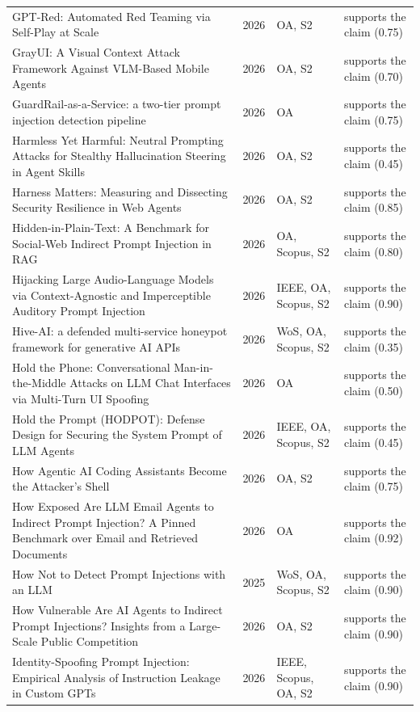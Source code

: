 \begin{longtable}{@{}%
  >{\raggedright\arraybackslash}p{}c%
  >{\raggedright\arraybackslash}p{}%
  >{\raggedright\arraybackslash}p{}@{}}
GPT-Red: Automated Red Teaming via Self-Play at Scale & 2026 & OA, S2 & supports the claim (0.75) \\
GrayUI: A Visual Context Attack Framework Against VLM-Based Mobile Agents & 2026 & OA, S2 & supports the claim (0.70) \\
GuardRail-as-a-Service: a two-tier prompt injection detection pipeline & 2026 & OA & supports the claim (0.75) \\
Harmless Yet Harmful: Neutral Prompting Attacks for Stealthy Hallucination Steering in Agent Skills & 2026 & OA, S2 & supports the claim (0.45) \\
Harness Matters: Measuring and Dissecting Security Resilience in Web Agents & 2026 & OA, S2 & supports the claim (0.85) \\
Hidden-in-Plain-Text: A Benchmark for Social-Web Indirect Prompt Injection in RAG & 2026 & OA, Scopus, S2 & supports the claim (0.80) \\
Hijacking Large Audio-Language Models via Context-Agnostic and Imperceptible Auditory Prompt Injection & 2026 & IEEE, OA, Scopus, S2 & supports the claim (0.90) \\
Hive-AI: a defended multi-service honeypot framework for generative AI APIs & 2026 & WoS, OA, Scopus, S2 & supports the claim (0.35) \\
Hold the Phone: Conversational Man-in-the-Middle Attacks on LLM Chat Interfaces via Multi-Turn UI Spoofing & 2026 & OA & supports the claim (0.50) \\
Hold the Prompt (HODPOT): Defense Design for Securing the System Prompt of LLM Agents & 2026 & IEEE, OA, Scopus, S2 & supports the claim (0.45) \\
How Agentic AI Coding Assistants Become the Attacker's Shell & 2026 & OA, S2 & supports the claim (0.75) \\
How Exposed Are LLM Email Agents to Indirect Prompt Injection? A Pinned Benchmark over Email and Retrieved Documents & 2026 & OA & supports the claim (0.92) \\
How Not to Detect Prompt Injections with an LLM & 2025 & WoS, OA, Scopus, S2 & supports the claim (0.90) \\
How Vulnerable Are AI Agents to Indirect Prompt Injections? Insights from a Large-Scale Public Competition & 2026 & OA, S2 & supports the claim (0.90) \\
Identity-Spoofing Prompt Injection: Empirical Analysis of Instruction Leakage in Custom GPTs & 2026 & IEEE, Scopus, OA, S2 & supports the claim (0.90) \\

\end{longtable}
